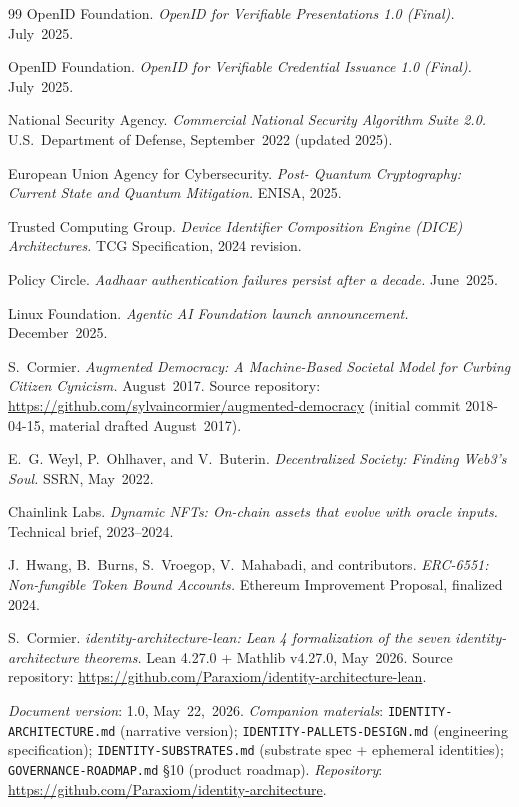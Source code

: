 \documentclass[11pt,a4paper,parskip=half-,DIV=12,headings=standardclasses]{scrartcl}
\theoremstyle{ncthm}
\theoremstyle{ncdef}
\begin{document}
\begin{thebibliography}{99}
 OpenID Foundation. \emph{OpenID for Verifiable
Presentations 1.0 (Final).} July~2025.

 OpenID Foundation. \emph{OpenID for Verifiable
Credential Issuance 1.0 (Final).} July~2025.

 National Security Agency. \emph{Commercial
National Security Algorithm Suite 2.0.} U.S.\ Department of Defense,
September~2022 (updated 2025).

 European Union Agency for Cybersecurity. \emph{Post-
Quantum Cryptography: Current State and Quantum Mitigation.} ENISA,
2025.

 Trusted Computing Group. \emph{Device Identifier
Composition Engine (DICE) Architectures.} TCG Specification,
2024 revision.

 Policy Circle. \emph{Aadhaar authentication
failures persist after a decade.} June~2025.

 Linux Foundation. \emph{Agentic AI
Foundation launch announcement.} December~2025.

 S.~Cormier.
\emph{Augmented Democracy: A Machine-Based Societal Model for Curbing
Citizen Cynicism.} August~2017. Source repository:
\url{https://github.com/sylvaincormier/augmented-democracy} (initial
commit 2018-04-15, material drafted August~2017).

 E.~G. Weyl, P.~Ohlhaver, and V.~Buterin.
\emph{Decentralized Society: Finding Web3's Soul.} SSRN, May~2022.

 Chainlink Labs. \emph{Dynamic NFTs:
On-chain assets that evolve with oracle inputs.} Technical brief,
2023--2024.

 J.~Hwang, B.~Burns, S.~Vroegop, V.~Mahabadi, and
contributors. \emph{ERC-6551: Non-fungible Token Bound Accounts.}
Ethereum Improvement Proposal, finalized 2024.

 S.~Cormier.
\emph{identity-architecture-lean: Lean 4 formalization of the seven
identity-architecture theorems.} Lean 4.27.0 + Mathlib v4.27.0,
May~2026. Source repository:
\url{https://github.com/Paraxiom/identity-architecture-lean}.

\end{thebibliography}

\bigskip

\noindent\emph{Document version}: 1.0, May~22,~2026.
\emph{Companion materials}:
\texttt{IDENTITY-ARCHITECTURE.md} (narrative version);
\texttt{IDENTITY-PALLETS-DESIGN.md} (engineering specification);
\texttt{IDENTITY-SUBSTRATES.md} (substrate spec + ephemeral identities);
\texttt{GOVERNANCE-ROADMAP.md} \S{}10 (product roadmap).
\emph{Repository}: \url{https://github.com/Paraxiom/identity-architecture}.
\end{document}
